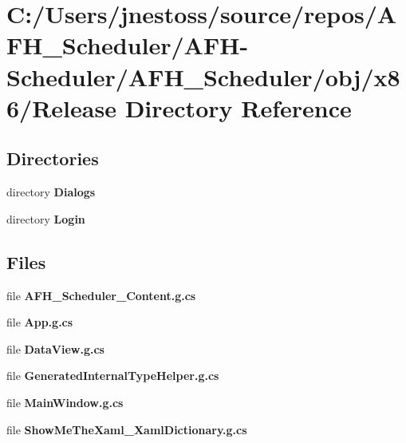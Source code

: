 \section{C\+:/\+Users/jnestoss/source/repos/\+A\+F\+H\+\_\+\+Scheduler/\+A\+F\+H-\/\+Scheduler/\+A\+F\+H\+\_\+\+Scheduler/obj/x86/\+Release Directory Reference}
\label{dir_6a672ec27b1f157fc36fd6daa06eec30}
\subsection*{Directories}
\begin{DoxyCompactItemize}
\item 
directory \textbf{ Dialogs}
\item 
directory \textbf{ Login}
\end{DoxyCompactItemize}
\subsection*{Files}
\begin{DoxyCompactItemize}
\item 
file \textbf{ A\+F\+H\+\_\+\+Scheduler\+\_\+\+Content.\+g.\+cs}
\item 
file \textbf{ App.\+g.\+cs}
\item 
file \textbf{ Data\+View.\+g.\+cs}
\item 
file \textbf{ Generated\+Internal\+Type\+Helper.\+g.\+cs}
\item 
file \textbf{ Main\+Window.\+g.\+cs}
\item 
file \textbf{ Show\+Me\+The\+Xaml\+\_\+\+Xaml\+Dictionary.\+g.\+cs}
\end{DoxyCompactItemize}
